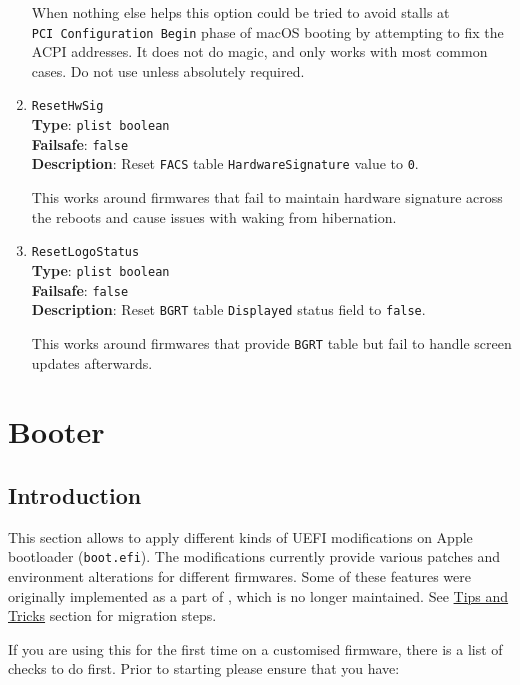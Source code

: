 \documentclass[]{article}
\makeatletter
\renewcommand{\label}[1]{%
\zref@wrapper@immediate{\oldlabel{#1}}}  %
\makeatother
\begin{document}
\begin{enumerate}
  When nothing else helps this option could be tried to avoid stalls at
  \texttt{PCI\ Configuration\ Begin} phase of macOS booting by
  attempting to fix the ACPI addresses. It does not do magic, and only
  works with most common cases. Do not use unless absolutely required.

\item
  \texttt{ResetHwSig}\\
  \textbf{Type}: \texttt{plist\ boolean}\\
  \textbf{Failsafe}: \texttt{false}\\
  \textbf{Description}: Reset \texttt{FACS} table \texttt{HardwareSignature}
  value to \texttt{0}.

  This works around firmwares that fail to maintain hardware signature across
  the reboots and cause issues with waking from hibernation.

\item
  \texttt{ResetLogoStatus}\\
  \textbf{Type}: \texttt{plist\ boolean}\\
  \textbf{Failsafe}: \texttt{false}\\
  \textbf{Description}: Reset \texttt{BGRT} table \texttt{Displayed}
  status field to \texttt{false}.

  This works around firmwares that provide \texttt{BGRT} table but
  fail to handle screen updates afterwards.

\end{enumerate}


\section{Booter}\label{booter}

\subsection{Introduction}\label{booterintro}

This section allows to apply different kinds of UEFI modifications on
Apple bootloader (\texttt{boot.efi}). The modifications currently provide
various patches and environment alterations for different firmwares. Some
of these features were originally implemented as a part of
\href{https://github.com/acidanthera/AptioFixPkg}{},
which is no longer maintained. See \hyperref[troubleshootingtricks]{Tips and Tricks}
section for migration steps.

If you are using this for the first time on a customised firmware, there is a
list of checks to do first. Prior to starting please ensure that you have:
\end{document}
